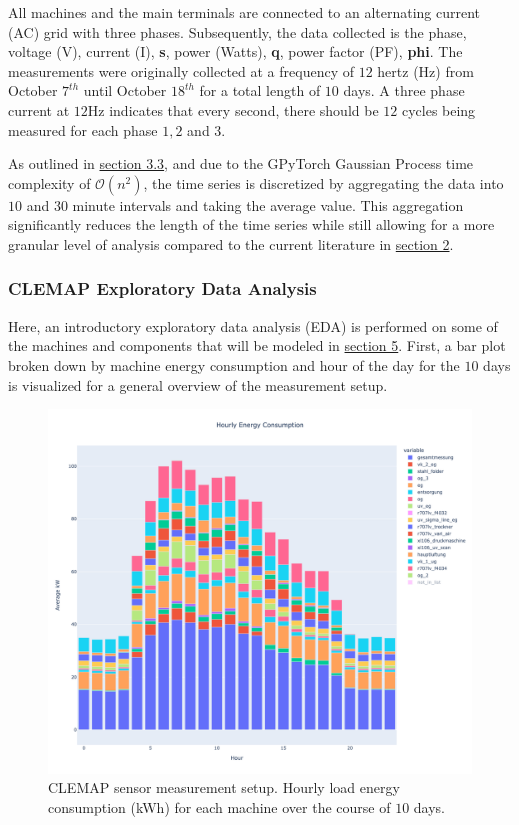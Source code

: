 All machines and the main terminals are connected to an alternating current (AC) grid with three phases. Subsequently, the data collected is the phase, voltage (V), current (I), \textbf{s}, power (Watts), \textbf{q}, power factor (PF), \textbf{phi}. The measurements were originally collected at a frequency of $12$ hertz (Hz) from October $7^{th}$ until October $18^{th}$ for a total length of $10$ days. A three phase current at $12$Hz indicates that every second, there should be $12$ cycles being measured for each phase $1, 2$ and $3$. 

As outlined in \hyperlink{section.3.3}{section 3.3}, and due to the GPyTorch Gaussian Process time complexity of $\mathcal{O}(n^2)$, the time series is discretized by aggregating the data into $10$ and $30$ minute intervals and taking the average value. This aggregation significantly reduces the length of the time series while still allowing for a more granular level of analysis compared to the current literature in \hyperlink{section.2}{section 2}.

\subsubsection{CLEMAP Exploratory Data Analysis}

Here, an introductory exploratory data analysis (EDA) is performed on some of the machines and components that will be modeled in \hyperlink{section.5}{section 5}. First, a bar plot broken down by machine energy consumption and hour of the day for the $10$ days is visualized for a general overview of the measurement setup.

\begin{figure}[htp]
\centering
\graphicspath{ {./images/} }
\includegraphics[scale=0.41]{images/hourly_load_barplot.png}
\caption{CLEMAP sensor measurement setup. Hourly load energy consumption (kWh) for each machine over the course of $10$ days.}
\end{figure}

